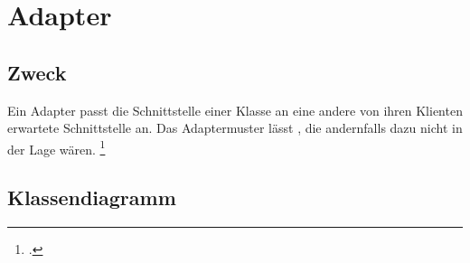 \documentclass{lehramt-informatik}
\begin{document}

\chapter{Adapter}

\begin{quellen}
\item \cite{wiki:adapter}
\item \cite[Seite 120-129]{gof}
\item \cite[Kapitel 8., Seite 255]{schatten}
\item \cite[Kapitel 5.1, Seite 77-79]{eilebrecht}
\item \cite[Kapitel 20, Seite 243]{siebler}
\end{quellen}

\section{Zweck}

Ein Adapter passt die Schnittstelle einer Klasse an eine andere von
ihren Klienten erwartete Schnittstelle an. Das Adaptermuster lässt
, die andernfalls dazu nicht in der Lage
wären.
\footcite[Seite 77]{eilebrecht}

%

\section{Klassendiagramm}


%
\end{document}

